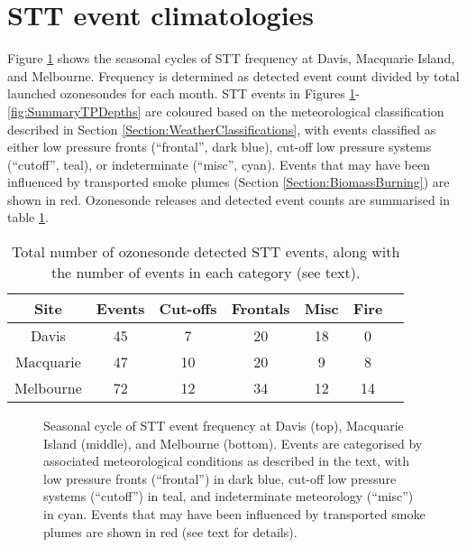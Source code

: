 \section{STT event climatologies}
  \label{sec:eventclimatologies}
  Figure \ref{fig:SummarySeasonality} shows the seasonal cycles of STT frequency at Davis, Macquarie Island, and Melbourne.
  Frequency is determined as detected event count divided by total launched ozonesondes for each month.
  STT events in Figures \ref{fig:SummarySeasonality}-\ref{fig:SummaryTPDepths} are coloured based on the meteorological classification described in Section \ref{Section:WeatherClassifications}, with events classified as either low pressure fronts (“frontal”, dark blue), cut-off low pressure systems (“cutoff”, teal), or indeterminate (“misc”, cyan).
  Events that may have been influenced by transported smoke plumes (Section \ref{Section:BiomassBurning}) are shown in red.
  Ozonesonde releases and detected event counts are summarised in table \ref{table:EventCounts}.
  \begin{table}[t]
    \caption{Total number of ozonesonde detected STT events, along with the number of events in each category (see text).}
    \begin{tabular}{| c | c | c | c | c | c | c |} 
      \hline
      Site & Events & Cut-offs & Frontals & Misc & Fire \\
      \hline
      Davis     & 45 & 7  & 20 & 18 & 0 \\ 
      Macquarie & 47 & 10 & 20 & 9 & 8 \\
      Melbourne & 72 & 12 & 34 & 12 & 14 \\
      \hline
    \end{tabular}
    \label{table:EventCounts}
  \end{table}
  
  \begin{figure}[t]
    
    \caption{Seasonal cycle of STT event frequency at Davis (top), Macquarie Island (middle), and Melbourne (bottom).
      Events are categorised by associated meteorological conditions as described in the text, with low pressure fronts (“frontal”) in dark blue, cut-off low pressure systems (“cutoff”) in teal, and indeterminate meteorology (“misc”) in cyan. 
      Events that may have been influenced by transported smoke plumes are shown in red (see text for details).}
    \label{fig:SummarySeasonality}
    
  \end{figure}
  
